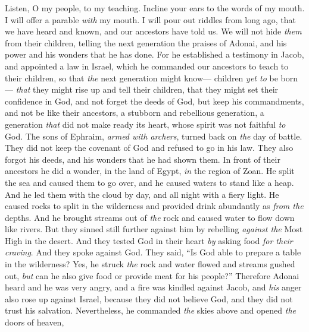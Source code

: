 \begin{biblechapter} %
 Listen, O my people, to my teaching. 
Incline your ears to the words of my mouth.
\verse I will offer a parable \textit{with} my mouth. 
I will pour out riddles from long ago,
\verse that we have heard and known, 
and our ancestors have told us.
\verse We will not hide \textit{them} from their children, 
telling the next generation the praises of Adonai, 
and his power and his wonders that he has done.
\verse For he established a testimony in Jacob, 
and appointed a law in Israel, 
which he commanded our ancestors 
to teach to their children,
\verse so that \textit{the} next generation might know— 
children \textit{yet to} be born— 
\textit{that} they might rise up and tell their children,
\verse that they might set their confidence in God, 
and not forget the deeds of God, 
but keep his commandments,
\verse and not be like their ancestors, 
a stubborn and rebellious generation, 
a generation \textit{that} did not make ready its heart, 
whose spirit was not faithful \textit{to} God.
\verse The sons of Ephraim, \textit{armed with archers}, 
turned back on \textit{the} day of battle.
\verse They did not keep the covenant of God 
and refused to go in his law.
\verse They also forgot his deeds, 
and his wonders that he had shown them.
\verse In front of their ancestors he did a wonder, 
in the land of Egypt, \textit{in} the region of Zoan.
\verse He split the sea and caused them to go over, 
and he caused waters to stand like a heap.
\verse And he led them with the cloud by day, 
and all night with a fiery light.
\verse He caused rocks to split in the wilderness 
and provided drink abundantly as \textit{from the} depths.
\verse And he brought streams out of \textit{the} rock 
and caused water to flow down like rivers.
\verse But they sinned still further against him 
by rebelling \textit{against the} Most High in the desert.
\verse And they tested God in their heart 
\textit{by} asking food \textit{for their craving}.
\verse And they spoke against God. 
They said, “Is God able 
to prepare a table in the wilderness?
\verse Yes, he struck \textit{the} rock and water flowed 
and streams gushed out, 
\textit{but} can he also give food 
or provide meat for his people?”
\verse Therefore Adonai heard 
and he was very angry, 
and a fire was kindled against Jacob, 
and \textit{his} anger also rose up against Israel,
\verse because they did not believe God, 
and they did not trust his salvation.
\verse Nevertheless, he commanded \textit{the} skies above 
and opened \textit{the} doors of heaven,

\end{biblechapter}
